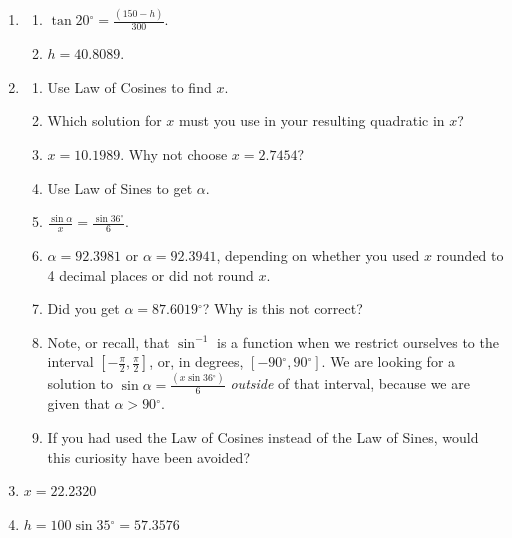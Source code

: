 \documentclass[english]{book}
\newcommand{\degrees}{\ensuremath{^{\circ}}}
\begin{document}
\begin{enumerate}
\begin{enumerate}[\hspace{1cm}a)]
                           \item $AB = 233.0254$.
                         \end{enumerate}
  \item[\hspace{1cm}34)] \begin{enumerate}[\hspace{1cm}a)]
                           \item $\tan 20 \degrees = \frac{(150-h)}{300}$.
                           \item $h = 40.8089$.
                         \end{enumerate}
  \item[\hspace{1cm}35)] \begin{enumerate}[\hspace{1cm}a)]
                           \item Use Law of Cosines to find $x$.
                           \item Which solution for $x$ must you use in your resulting quadratic in $x$?
                           \item $x = 10.1989$. Why not choose $x = 2.7454$?
                           \item Use Law of Sines to get $\alpha$.
                           \item $\frac{\sin \alpha}{x} = \frac{\sin 36 \degrees}{6}$.
                           \item $\alpha = 92.3981$ or $\alpha = 92.3941$, depending on whether you used $x$ rounded to 4 decimal places or did not round $x$.
                           \item Did you get $\alpha = 87.6019 \degrees$? Why is this not correct?
                           \item Note, or recall, that $\sin^{-1}$ is a function when we restrict ourselves to the interval $[-\frac{\pi}{2},\frac{\pi}{2}]$, or, in degrees, $[-90 \degrees , 90 \degrees]$. We are looking for a solution to $\sin \alpha = \frac{(x \sin 36 \degrees)}{6}$ \emph{outside} of that interval, because we are given that $\alpha > 90 \degrees$.
                           \item If you had used the Law of Cosines instead of the Law of Sines, would this curiosity have been avoided?
                         \end{enumerate}
  \item[\hspace{1cm}36)] $x = 22.2320$
  \item[\hspace{1cm}37)] $h = 100 \sin 35 \degrees = 57.3576$


\end{enumerate}
\end{document}
